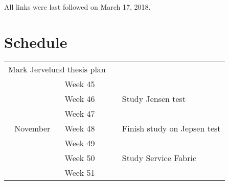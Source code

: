 \documentclass[
  a4paper,  %
  twoside,  %
  bibliography=totoc,
  headsepline,
  cleardoublepage=empty,
  parskip=half,
  draft=false
]{scrbook}
\begin{document}
All links were last followed on March 17, 2018.



\newpage
\appendix


\section{Schedule}


\begin{tabular}{clll}
\multicolumn{2}{l}{Mark Jervelund thesis plan} &                                           &                  \\
                                & Week 45      &                                             &                                                                                                                            \\
                                & Week 46      &                                             & \multirow{-2}{*}{Study Jensen test}                                                                                        \\
                                & Week 47      &                                             &                                                                                                                            \\
\multirow{-4}{*}{November}      & Week 48      &                                             & \multirow{-2}{*}{Finish study on Jepsen test}                                                                              \\
                                & Week 49      &                                             &                                                                                                                            \\
                                & Week 50      &                                             & \multirow{-2}{*}{Study Service Fabric}                                                                                     \\
                                & Week 51      &                                             &                                                                            \\

\end{tabular}
\end{document}
